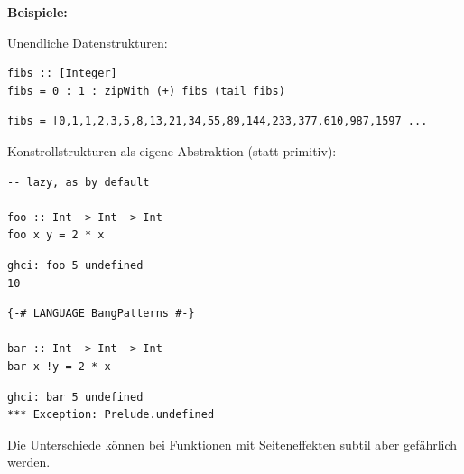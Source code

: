 \documentclass[unknownkeysallowed]{beamer}
\begin{document}
\begin{frame}[fragile]

\Large\textbf{Beispiele:} \normalsize \smallskip
\pause

Unendliche Datenstrukturen:

\begin{verbatim}
fibs :: [Integer]
fibs = 0 : 1 : zipWith (+) fibs (tail fibs)
\end{verbatim}

\pause

\begin{verbatim}
fibs = [0,1,1,2,3,5,8,13,21,34,55,89,144,233,377,610,987,1597 ...
\end{verbatim}

\smallskip
\pause

Konstrollstrukturen als eigene Abstraktion (statt primitiv):
\pause

\begin{multicols}{2}

\begin{verbatim}
-- lazy, as by default

foo :: Int -> Int -> Int
foo x y = 2 * x
\end{verbatim}

\pause

\begin{verbatim}
ghci: foo 5 undefined
10
\end{verbatim}

\pause
\columnbreak

\begin{verbatim}
{-# LANGUAGE BangPatterns #-}

bar :: Int -> Int -> Int
bar x !y = 2 * x
\end{verbatim}

\pause

\begin{verbatim}
ghci: bar 5 undefined
*** Exception: Prelude.undefined
\end{verbatim}
\end{multicols}
\pause

Die Unterschiede können bei Funktionen mit Seiteneffekten subtil aber gefährlich werden.

\end{frame}

\end{document}

